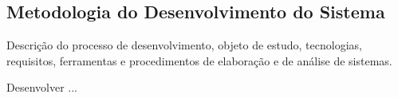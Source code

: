 \subsection{Metodologia do Desenvolvimento do Sistema}
 Descrição do processo de desenvolvimento, objeto de estudo, tecnologias, requisitos, ferramentas e procedimentos de elaboração e de análise de sistemas.

Desenvolver ...



